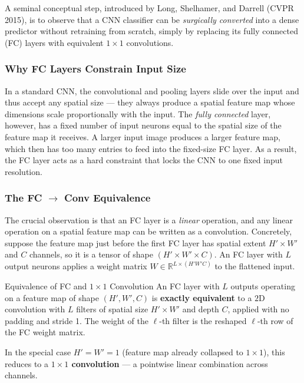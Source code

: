 \documentclass[11pt,a4paper]{article}
\begin{document}
A seminal conceptual step, introduced by Long, Shelhamer, and Darrell (CVPR 2015), is to observe that a CNN classifier can be \emph{surgically converted} into a dense predictor without retraining from scratch, simply by replacing its fully connected (FC) layers with equivalent $1\times 1$ convolutions.

\subsubsection{Why FC Layers Constrain Input Size}

In a standard CNN, the convolutional and pooling layers slide over the input and thus accept any spatial size — they always produce a spatial feature map whose dimensions scale proportionally with the input. The \emph{fully connected} layer, however, has a fixed number of input neurons equal to the spatial size of the feature map it receives. A larger input image produces a larger feature map, which then has too many entries to feed into the fixed-size FC layer. As a result, the FC layer acts as a hard constraint that locks the CNN to one fixed input resolution.

\subsubsection{The FC $\to$ Conv Equivalence}

The crucial observation is that an FC layer is a \emph{linear} operation, and any linear operation on a spatial feature map can be written as a convolution. Concretely, suppose the feature map just before the first FC layer has spatial extent $H' \times W'$ and $C$ channels, so it is a tensor of shape $(H' \times W' \times C)$. An FC layer with $L$ output neurons applies a weight matrix $W \in \mathbb{R}^{L \times (H' W' C)}$ to the flattened input.

\begin{defbox}{Equivalence of FC and $1\times1$ Convolution}
An FC layer with $L$ outputs operating on a feature map of shape $(H', W', C)$ is \textbf{exactly equivalent} to a $2$D convolution with $L$ filters of spatial size $H' \times W'$ and depth $C$, applied with no padding and stride 1. The weight of the $\ell$-th filter is the reshaped $\ell$-th row of the FC weight matrix.

In the special case $H' = W' = 1$ (feature map already collapsed to $1\times 1$), this reduces to a \textbf{$1\times 1$ convolution} — a pointwise linear combination across channels.
\end{defbox}
\end{document}
